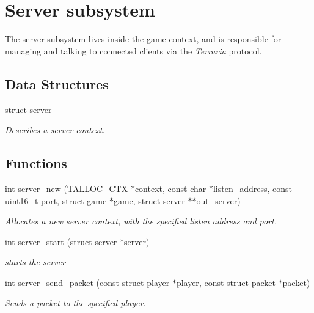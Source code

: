 \hypertarget{group__server}{}\section{Server subsystem}
\label{group__server}


The server subsystem lives inside the {\ttfamily game} context, and is responsible for managing and talking to connected clients via the {\itshape Terraria} protocol.  


\subsection*{Data Structures}
\begin{DoxyCompactItemize}
\item 
struct \hyperlink{structserver}{server}
\begin{DoxyCompactList}\small\item\em Describes a server context. \end{DoxyCompactList}\end{DoxyCompactItemize}
\subsection*{Functions}
\begin{DoxyCompactItemize}
\item 
int \hyperlink{group__server_gac98cdc3daa5c89785e0dae45dc8d6c56}{server\+\_\+new} (\hyperlink{group__talloc_ga8a521b1347c0e37b84eb942db8fa9beb}{T\+A\+L\+L\+O\+C\+\_\+\+C\+T\+X} $\ast$context, const char $\ast$listen\+\_\+address, const uint16\+\_\+t port, struct \hyperlink{structgame}{game} $\ast$\hyperlink{structgame}{game}, struct \hyperlink{structserver}{server} $\ast$$\ast$out\+\_\+server)
\begin{DoxyCompactList}\small\item\em Allocates a new server context, with the specified listen address and port. \end{DoxyCompactList}\item 
int \hyperlink{group__server_gaf6735c294993687a5e385b1e2e2f778f}{server\+\_\+start} (struct \hyperlink{structserver}{server} $\ast$\hyperlink{structserver}{server})
\begin{DoxyCompactList}\small\item\em starts the server \end{DoxyCompactList}\item 
int \hyperlink{group__server_ga139b4c0888c43a7e35793bcb25f3c522}{server\+\_\+send\+\_\+packet} (const struct \hyperlink{structplayer}{player} $\ast$\hyperlink{structplayer}{player}, const struct \hyperlink{structpacket}{packet} $\ast$\hyperlink{structpacket}{packet})
\begin{DoxyCompactList}\small\item\em Sends a packet to the specified player. \end{DoxyCompactList}\end{DoxyCompactItemize}


